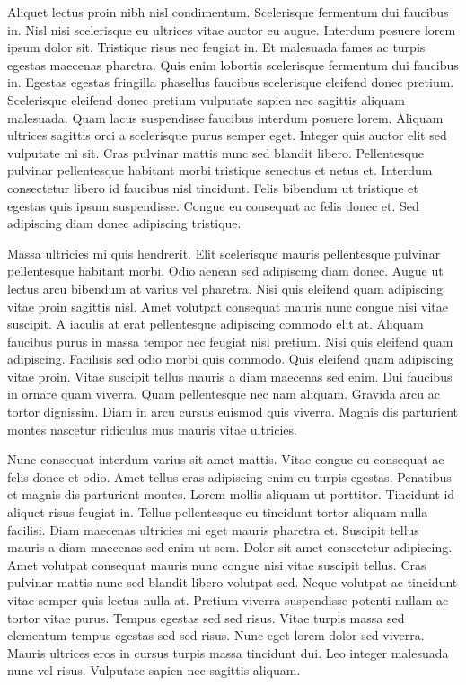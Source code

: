 \documentclass[12pt]{article}
\begin{document}
Aliquet lectus proin nibh nisl condimentum. Scelerisque fermentum dui faucibus in. Nisl nisi scelerisque eu ultrices vitae auctor eu augue. Interdum posuere lorem ipsum dolor sit. Tristique risus nec feugiat in. Et malesuada fames ac turpis egestas maecenas pharetra. Quis enim lobortis scelerisque fermentum dui faucibus in. Egestas egestas fringilla phasellus faucibus scelerisque eleifend donec pretium. Scelerisque eleifend donec pretium vulputate sapien nec sagittis aliquam malesuada. Quam lacus suspendisse faucibus interdum posuere lorem. Aliquam ultrices sagittis orci a scelerisque purus semper eget. Integer quis auctor elit sed vulputate mi sit. Cras pulvinar mattis nunc sed blandit libero. Pellentesque pulvinar pellentesque habitant morbi tristique senectus et netus et. Interdum consectetur libero id faucibus nisl tincidunt. Felis bibendum ut tristique et egestas quis ipsum suspendisse. Congue eu consequat ac felis donec et. Sed adipiscing diam donec adipiscing tristique.

Massa ultricies mi quis hendrerit. Elit scelerisque mauris pellentesque pulvinar pellentesque habitant morbi. Odio aenean sed adipiscing diam donec. Augue ut lectus arcu bibendum at varius vel pharetra. Nisi quis eleifend quam adipiscing vitae proin sagittis nisl. Amet volutpat consequat mauris nunc congue nisi vitae suscipit. A iaculis at erat pellentesque adipiscing commodo elit at. Aliquam faucibus purus in massa tempor nec feugiat nisl pretium. Nisi quis eleifend quam adipiscing. Facilisis sed odio morbi quis commodo. Quis eleifend quam adipiscing vitae proin. Vitae suscipit tellus mauris a diam maecenas sed enim. Dui faucibus in ornare quam viverra. Quam pellentesque nec nam aliquam. Gravida arcu ac tortor dignissim. Diam in arcu cursus euismod quis viverra. Magnis dis parturient montes nascetur ridiculus mus mauris vitae ultricies.

Nunc consequat interdum varius sit amet mattis. Vitae congue eu consequat ac felis donec et odio. Amet tellus cras adipiscing enim eu turpis egestas. Penatibus et magnis dis parturient montes. Lorem mollis aliquam ut porttitor. Tincidunt id aliquet risus feugiat in. Tellus pellentesque eu tincidunt tortor aliquam nulla facilisi. Diam maecenas ultricies mi eget mauris pharetra et. Suscipit tellus mauris a diam maecenas sed enim ut sem. Dolor sit amet consectetur adipiscing. Amet volutpat consequat mauris nunc congue nisi vitae suscipit tellus. Cras pulvinar mattis nunc sed blandit libero volutpat sed. Neque volutpat ac tincidunt vitae semper quis lectus nulla at. Pretium viverra suspendisse potenti nullam ac tortor vitae purus. Tempus egestas sed sed risus. Vitae turpis massa sed elementum tempus egestas sed sed risus. Nunc eget lorem dolor sed viverra. Mauris ultrices eros in cursus turpis massa tincidunt dui. Leo integer malesuada nunc vel risus. Vulputate sapien nec sagittis aliquam.
\end{document}
